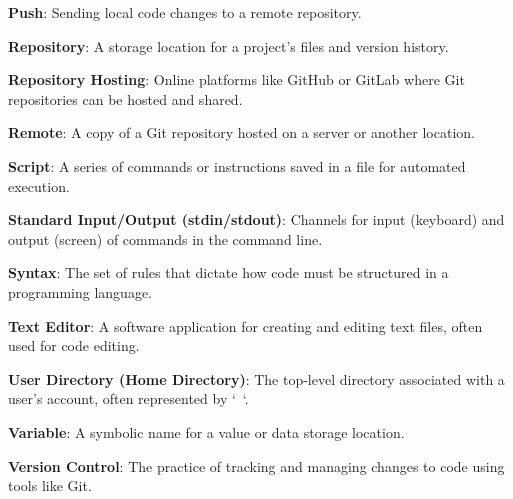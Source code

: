\documentclass[9pt]{cheatsheet}
\begin{document}
\begin{multicols*}{3}
\textbf{Push}: Sending local code changes to a remote repository.

\textbf{Repository}: A storage location for a project's files and version history.

\textbf{Repository Hosting}: Online platforms like GitHub or GitLab where Git repositories can be hosted and shared.

\textbf{Remote}: A copy of a Git repository hosted on a server or another location.

\textbf{Script}: A series of commands or instructions saved in a file for automated execution.

\textbf{Standard Input/Output (stdin/stdout)}: Channels for input (keyboard) and output (screen) of commands in the command line.

\textbf{Syntax}: The set of rules that dictate how code must be structured in a programming language.

\textbf{Text Editor}: A software application for creating and editing text files, often used for code editing.

\textbf{User Directory (Home Directory)}: The top-level directory associated with a user's account, often represented by `~`.

\textbf{Variable}: A symbolic name for a value or data storage location.

\textbf{Version Control}: The practice of tracking and managing changes to code using tools like Git.

\vfill


\end{multicols*}
\end{document}
